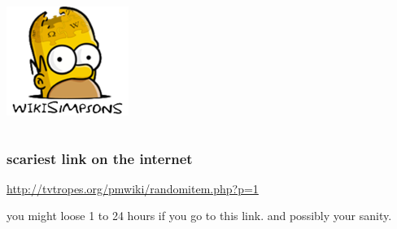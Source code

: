 \documentclass{beamer}
\begin{document}
\begin{frame}
\begin{columns}
\begin{column}{0.5\textwidth}
      \includegraphics[width = \textwidth, height = 0.4\textheight, keepaspectratio = true]{figure/simpsons_2}
    \end{column}
  \end{columns}
\end{frame}

\begin{frame}
  \frametitle{scariest link on the internet}

  \url{http://tvtropes.org/pmwiki/randomitem.php?p=1}

  you might loose 1 to 24 hours if you go to this link. and possibly your sanity.
\end{frame}
\end{document}
